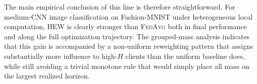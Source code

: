 \documentclass{article}
\theoremstyle{definition}
\begin{document}
The main empirical conclusion of this line is therefore straightforward. For medium-CNN image classification on Fashion-MNIST under heterogeneous local computation, \textsc{HEW} is clearly stronger than \textsc{FedAvg} both in final performance and along the full optimization trajectory. The grouped-mass analysis indicates that this gain is accompanied by a non-uniform reweighting pattern that assigns substantially more influence to high-\(H\) clients than the uniform baseline does, while still avoiding a trivial monotone rule that would simply place all mass on the largest realized horizon.






\end{document}

